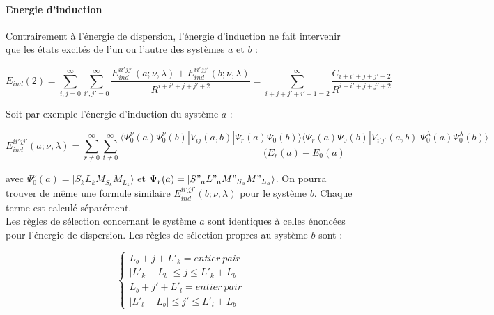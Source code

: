 	
	\paragraph{Energie d’induction}
	
	Contrairement à l'énergie de dispersion, l'énergie d'induction ne fait intervenir que les états excités de l'un ou l'autre des systèmes $a$ et $b$ : 
	
	\begin{equation}
	E_{ind}(2) = \sum_{i,j=0}^{\infty} \sum_{i',j'=0}^{\infty} \frac{E_{ind}^{ii'jj'} (a; \nu , \lambda) + E_{ind}^{ii'jj'} (b; \nu , \lambda)}{R^{i+i'+j+j'+2}} = \sum_{i+j+j'+i'+1=2}^{\infty} \frac{C_{i+i'+j+j'+2}}{R^{i+i'+j+j'+2}} \label{2.42}
	\end{equation}
	
	Soit par exemple l'énergie d'induction du système $a$ :
	
	\begin{equation}
	E_{ind}^{ii'jj'} (a;\nu , \lambda) = \sum_{r \neq 0}^{\infty} \sum_{t\neq 0}^{\infty} \frac{\langle \Psi_{0}^{\nu} (a) \Psi_{0}^{\nu} (b) |V_{ij} (a,b)|\Psi_{r} (a) \Psi_{0} (b) \rangle  \langle \Psi_{r} (a)\Psi_{0} (b) |V_{i'j'} (a,b)|\Psi_{0}^{\lambda} (a) \Psi_{0}^{\lambda}(b) \rangle}{(E_{r} (a) - E_{0}(a)}
	\end{equation}
	
	\noindent avec $\Psi_{0}^{\nu} (a) = |S_{k} L_{k} M_{S_{k}} M_{L_{k}}\rangle$ et $\Psi_{r}(a) = |S"_{a} L"_{a} M"_{S_{a}} M"_{L_{a}}\rangle$. On pourra trouver de même une formule similaire $E_{ind}^{ii'jj'} (b;\nu , \lambda)$ pour le système $b$. Chaque terme est calculé séparément.\\
	
	Les règles de sélection concernant le système $a$ sont identiques à celles énoncées pour l'énergie de dispersion.
	Les règles de sélection propres au système $b$ sont : 
	
	\begin{equation}
	\begin{cases}
	L_{b} + j + L'_{k} = entier\ pair \\
	|L'_{k} - L_{b}| \leq j \leq L'_{k} + L_{b} \\
	L_{b} + j' + L'_{l} = entier\ pair \\
	|L'_{l} - L_{b}| \leq j' \leq L'_{l} + L_{b}
	\end{cases}
	\end{equation}
	
